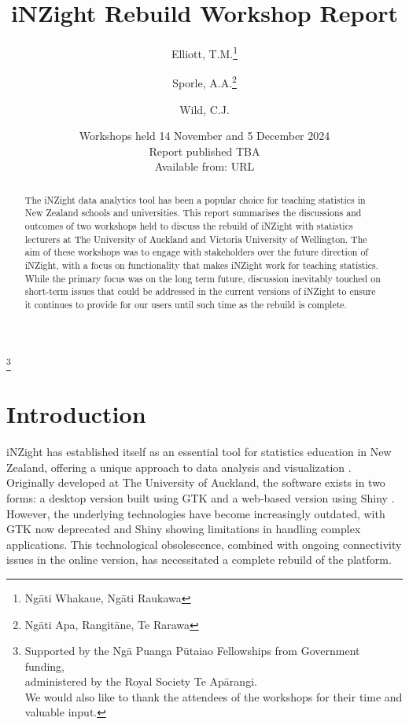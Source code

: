 \documentclass{article}
\title{iNZight Rebuild Workshop Report}
\author[1,2]{Elliott, T.M.\thanks{Ngāti Whakaue, Ngāti Raukawa}}
\author[1,2]{Sporle, A.A.\thanks{Ngāti Apa, Rangitāne, Te Rarawa}}
\author[1]{Wild, C.J.}
\affil[1]{iNZight Analytics Ltd}
\affil[2]{The University of Auckland}
\date{\small Workshops held 14 November and 5 December 2024\\
Report published TBA\\
Available from: URL
}
\begin{document}
\maketitle
\thispagestyle{empty}

\begin{abstract}
    The iNZight data analytics tool has been a popular choice for teaching statistics in New Zealand schools and universities. This report summarises the discussions and outcomes of two workshops held to discuss the rebuild of iNZight with statistics lecturers at The University of Auckland and Victoria University of Wellington. The aim of these workshops was to engage with stakeholders over the future direction of iNZight, with a focus on functionality that makes iNZight work for teaching statistics. While the primary focus was on the long term future, discussion inevitably touched on short-term issues that could be addressed in the current versions of iNZight to ensure it continues to provide for our users until such time as the rebuild is complete.
\end{abstract}

\vfill

\begin{center}
\thanks{\noindent Supported by the Ngā Puanga Pūtaiao Fellowships from
Government funding,\\administered by the Royal Society Te Apārangi.\\We would also like to thank the attendees of the workshops for their time and valuable input.}
\end{center}
\vspace{1em}


\section{Introduction}

iNZight has established itself as an essential tool for statistics education in New Zealand, offering a unique approach to data analysis and visualization \parencite{Wild2021,Wild2022}.
Originally developed at The University of Auckland, the software exists in two forms: a desktop version built using GTK \parencite{GTKTeam2020} and a web-based version using Shiny \parencite{Chang2021}.
However, the underlying technologies have become increasingly outdated, with GTK now deprecated and Shiny showing limitations in handling complex applications.
This technological obsolescence, combined with ongoing connectivity issues in the online version, has necessitated a complete rebuild of the platform.
\end{document}
